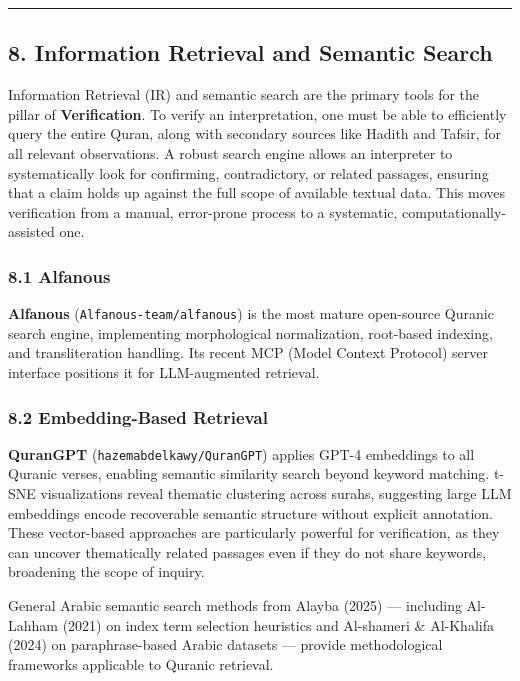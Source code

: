 \documentclass[12pt,a4paper]{article}
\begin{document}
\begin{center}\rule{0.5\linewidth}{0.5pt}\end{center}

\protect{}\label{s8}
\subsection{8. Information Retrieval and Semantic
Search}\label{information-retrieval-and-semantic-search}

Information Retrieval (IR) and semantic search are the primary tools for
the pillar of \textbf{Verification}. To verify an interpretation, one
must be able to efficiently query the entire Quran, along with secondary
sources like Hadith and Tafsir, for all relevant observations. A robust
search engine allows an interpreter to systematically look for
confirming, contradictory, or related passages, ensuring that a claim
holds up against the full scope of available textual data. This moves
verification from a manual, error-prone process to a systematic,
computationally-assisted one.

\subsubsection{8.1 Alfanous}\label{alfanous}

\textbf{Alfanous} (\texttt{Alfanous-team/alfanous}) is the most mature
open-source Quranic search engine, implementing morphological
normalization, root-based indexing, and transliteration handling. Its
recent MCP (Model Context Protocol) server interface positions it for
LLM-augmented retrieval.

\subsubsection{8.2 Embedding-Based
Retrieval}\label{embedding-based-retrieval}

\textbf{QuranGPT} (\texttt{hazemabdelkawy/QuranGPT}) applies GPT-4
embeddings to all Quranic verses, enabling semantic similarity search
beyond keyword matching. t-SNE visualizations reveal thematic clustering
across surahs, suggesting large LLM embeddings encode recoverable
semantic structure without explicit annotation. These vector-based
approaches are particularly powerful for verification, as they can
uncover thematically related passages even if they do not share
keywords, broadening the scope of inquiry.

General Arabic semantic search methods from Alayba (2025) --- including
Al-Lahham (2021) on index term selection heuristics and Al-shameri \&
Al-Khalifa (2024) on paraphrase-based Arabic datasets --- provide
methodological frameworks applicable to Quranic retrieval.
\end{document}
